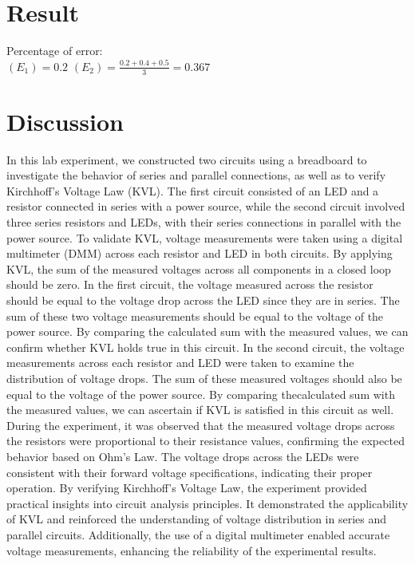 \documentclass{report}
\begin{document}
\section{Result}
Percentage of error: \\
$(E_1) = 0.2$
$(E_2) = \frac{0.2+0.4+0.5}{3} = 0.367$

\section{Discussion}
In this lab experiment, we constructed two circuits using a breadboard to
investigate the behavior of series and parallel connections, as well as to verify
Kirchhoff's Voltage Law (KVL). The first circuit consisted of an LED and a
resistor connected in series with a power source, while the second circuit involved
three series resistors and LEDs, with their series connections in parallel with the
power source.
To validate KVL, voltage measurements were taken using a digital multimeter
(DMM) across each resistor and LED in both circuits. By applying KVL, the sum
of the measured voltages across all components in a closed loop should be zero.
In the first circuit, the voltage measured across the resistor should be equal to the
voltage drop across the LED since they are in series. The sum of these two voltage
measurements should be equal to the voltage of the power source. By comparing
the calculated sum with the measured values, we can confirm whether KVL holds
true in this circuit.
In the second circuit, the voltage measurements across each resistor and LED were
taken to examine the distribution of voltage drops. The sum of these measured
voltages should also be equal to the voltage of the power source. By comparing thecalculated sum with the measured values, we can ascertain if KVL is satisfied in
this circuit as well.
During the experiment, it was observed that the measured voltage drops across the
resistors were proportional to their resistance values, confirming the expected
behavior based on Ohm's Law. The voltage drops across the LEDs were consistent
with their forward voltage specifications, indicating their proper operation.
By verifying Kirchhoff's Voltage Law, the experiment provided practical insights
into circuit analysis principles. It demonstrated the applicability of KVL and
reinforced the understanding of voltage distribution in series and parallel circuits.
Additionally, the use of a digital multimeter enabled accurate voltage
measurements, enhancing the reliability of the experimental results.
\end{document}
